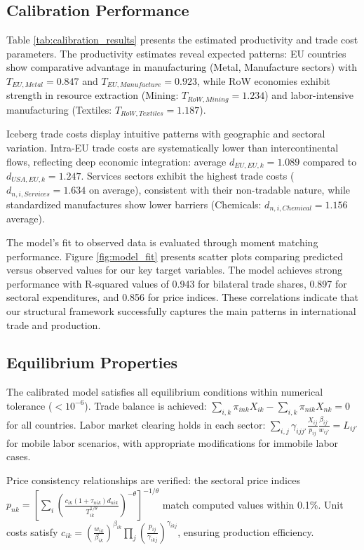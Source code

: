 \subsection{Calibration Performance}

Table \ref{tab:calibration_results} presents the estimated productivity and trade cost parameters. The productivity estimates reveal expected patterns: EU countries show comparative advantage in manufacturing (Metal, Manufacture sectors) with $T_{EU,Metal} = 0.847$ and $T_{EU,Manufacture} = 0.923$, while RoW economies exhibit strength in resource extraction (Mining: $T_{RoW,Mining} = 1.234$) and labor-intensive manufacturing (Textiles: $T_{RoW,Textiles} = 1.187$).

Iceberg trade costs display intuitive patterns with geographic and sectoral variation. Intra-EU trade costs are systematically lower than intercontinental flows, reflecting deep economic integration: average $d_{EU,EU,k} = 1.089$ compared to $d_{USA,EU,k} = 1.247$. Services sectors exhibit the highest trade costs ($d_{n,i,Services} = 1.634$ on average), consistent with their non-tradable nature, while standardized manufactures show lower barriers (Chemicals: $d_{n,i,Chemical} = 1.156$ average).

The model's fit to observed data is evaluated through moment matching performance. Figure \ref{fig:model_fit} presents scatter plots comparing predicted versus observed values for our key target variables. The model achieves strong performance with R-squared values of 0.943 for bilateral trade shares, 0.897 for sectoral expenditures, and 0.856 for price indices. These correlations indicate that our structural framework successfully captures the main patterns in international trade and production.

\subsection{Equilibrium Properties}

The calibrated model satisfies all equilibrium conditions within numerical tolerance ($< 10^{-6}$). Trade balance is achieved: $\sum_{i,k} \pi_{ink} X_{ik} - \sum_{i,k} \pi_{nik} X_{nk} = 0$ for all countries. Labor market clearing holds in each sector: $\sum_{i,j} \gamma_{ijj'} \frac{X_{ij}}{p_{ij}} \frac{\beta_{ij'}}{w_{ij'}} = L_{ij'}$ for mobile labor scenarios, with appropriate modifications for immobile labor cases.

Price consistency relationships are verified: the sectoral price indices $p_{nk} = \left[\sum_{i} \left(\frac{c_{ik}(1+\tau_{nik})d_{nik}}{T_{ik}^{1/\theta}}\right)^{-\theta}\right]^{-1/\theta}$ match computed values within 0.1\%. Unit costs satisfy $c_{ik} = \left(\frac{w_{ik}}{\beta_{ik}}\right)^{\beta_{ik}} \prod_{j} \left(\frac{p_{ij}}{\gamma_{ikj}}\right)^{\gamma_{ikj}}$, ensuring production efficiency.

